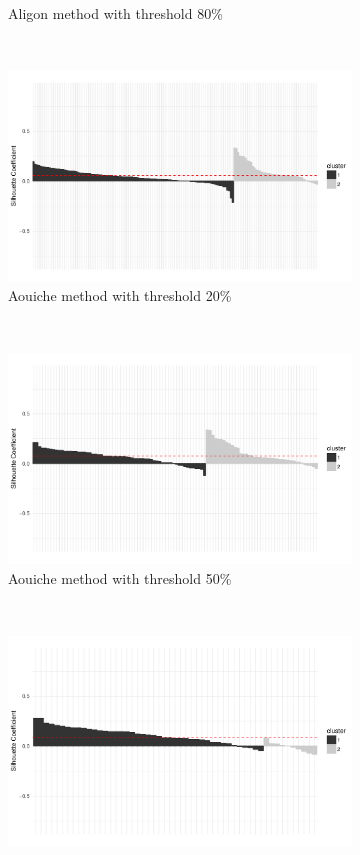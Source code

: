 \begin{figure}[h!]
\begin{subfigure}[b]{0.322\textwidth}
        \caption{Aligon method with threshold 80\%}
    \end{subfigure}
    \\
    \begin{subfigure}[b]{0.322\textwidth}%
        \centering
        \includegraphics[width=\textwidth]{graphics/sil_ub_aouiche_0.2.pdf}
        \caption{Aouiche method with threshold 20\%}
    \end{subfigure}%
    ~
    \begin{subfigure}[b]{0.322\textwidth}%
        \centering
        \includegraphics[width=\textwidth]{graphics/sil_ub_aouiche_0.5.pdf}
        \caption{Aouiche method with threshold 50\%}
    \end{subfigure}
    ~
    \begin{subfigure}[b]{0.322\textwidth}%
        \centering
        \includegraphics[width=\textwidth]{graphics/sil_ub_aouiche_0.8.pdf}

\end{subfigure}
\end{figure}

